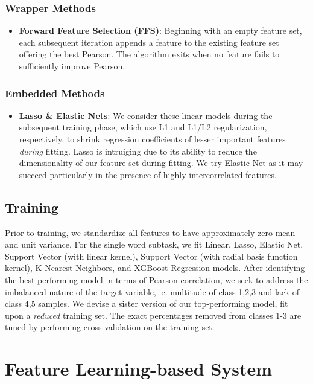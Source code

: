 \documentclass{dcthesis}
\theoremstyle{definition}
\theoremstyle{remark}
\begin{document}
\subsubsection{Wrapper Methods}

\begin{itemize}
  \item \textbf{Forward Feature Selection (FFS)}: Beginning with an empty feature set, each subsequent iteration appends a feature to the existing feature set offering the best Pearson. The algorithm exits when no feature fails to sufficiently improve Pearson.
\end{itemize}

\subsubsection{Embedded Methods}
\begin{itemize}
  \item \textbf{Lasso \& Elastic Nets}: We consider these linear models during the subsequent training phase, which use L1 and L1/L2 regularization, respectively, to shrink regression coefficients of lesser important features \textit{during} fitting. Lasso \citep{Tibshirani.x} is intruiging due to its ability to reduce the dimensionality of our feature set during fitting. We try Elastic Net \citep{10.2307/3647580} as it may succeed particularly in the presence of highly intercorrelated features.
\end{itemize}

\subsection{Training}

Prior to training, we standardize all features to have approximately zero mean and unit variance. For the single word subtask, we fit Linear, Lasso, Elastic Net, Support Vector (with linear kernel),  Support Vector (with radial basis function kernel), K-Nearest Neighbors, and XGBoost Regression models. After identifying the best performing model in terms of Pearson correlation, we seek to address the imbalanced nature of the target variable, ie. multitude of class 1,2,3 and lack of class 4,5 samples. We devise a sister version of our top-performing model, fit upon a \textit{reduced} training set. The exact percentages removed from classes 1-3 are tuned by performing cross-validation on the training set.

\section{Feature Learning-based System}
\end{document}
